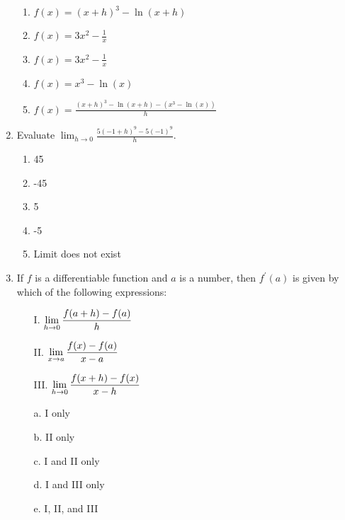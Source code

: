 \documentclass[12pt]{report}
\begin{document}
\begin{enumerate}
\begin{enumerate}

\item $f(x) = (x+h)^3-\ln(x+h)$

\item $f(x) = 3x^2 - \frac{1}{x}$

\item $f(x) = 3x^2 - \frac{1}{x}$

\item $f(x) = x^3 - \ln(x)$

\item $f(x) = \frac{(x+h)^3-\ln(x+h) - \left(x^3-\ln(x)\right)}{h}$

\end{enumerate}

\item Evaluate $\lim_{h \to 0} \frac{5\left(-1+h\right)^9 - 5\left(-1\right)^9}{h}$.

\begin{enumerate}

\item 45

\item -45

\item 5

\item -5

\item Limit does not exist

\end{enumerate}

\item If $f$ is a differentiable function and $a$ is a number, then $f^\prime(a)$ is given by which of the following expressions: \vspace{0.2cm}
\begin{enumerate}
\item [I.] $\displaystyle \lim_{h \to 0}\frac{f(a+h)-f(a)}{h}$ \vspace{0.2cm}
\item [II.] $\displaystyle \lim_{x \to a}\frac{f(x)-f(a)}{x-a}$ \vspace{0.2cm}
\item [III.] $\displaystyle \lim_{h \to 0}\frac{f(x+h)-f(x)}{x-h}$\\
\end{enumerate}
\begin{enumerate}
\item [a.] I only
\item [b.] II only
\item [c.] I and II only
\item [d.] I and III only
\item [e.] I, II, and III
\end{enumerate}


\end{enumerate}
\end{document}
